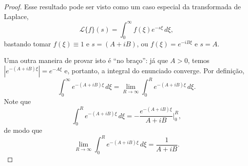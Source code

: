         \begin{proof}
            Esse resultado pode ser visto como um caso especial da transformada de Laplace,
            \begin{equation*}
                \mathcal{L}\{f\}(s) = \int_0^{\infty} f(\xi) e^{-s\xi} \, d\xi,
            \end{equation*}
            bastando tomar 
            $f(\xi)\equiv 1$ e $s = (A+iB)$, ou 
            $f(\xi) = e^{-iB\xi}$ e $s = A$.
            
            Uma outra maneira de provar isto é ``no braço'': já que $A > 0$, temos $|e^{-(A+iB)\xi}| = e^{-A\xi}$
            e, portanto, a integral do enunciado converge. Por definição,
            \begin{equation*}
                \int_0^{\infty} e^{-(A+iB)\xi} \, d\xi = \lim_{R\to\infty} \int_0^R e^{-(A+iB)\xi} \, d\xi.
            \end{equation*}
            Note que
            \begin{equation*}
                \int_0^R e^{-(A+iB)\xi} \, d\xi = -\frac{e^{-(A+iB)\xi}}{A+iB}\Bigg|_0^R,
            \end{equation*}
            de modo que
            \begin{equation*}
                \lim_{R\to\infty} \int_0^R e^{-(A+iB)\xi} \, d\xi = \frac{1}{A+iB}.
            \end{equation*}
        \end{proof}
        
